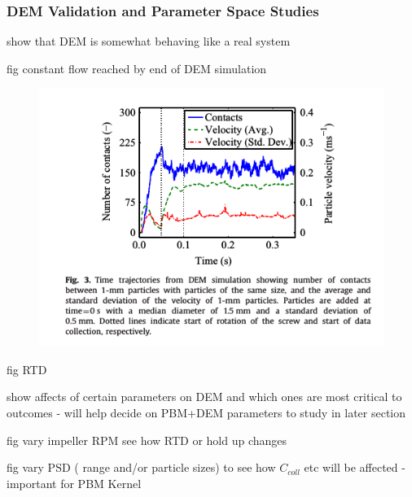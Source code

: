 \documentclass[preprint,11pt,authoryear]{elsarticle}
\begin{document}
    \subsubsection{DEM Validation and Parameter Space Studies}
    \par show that DEM is somewhat behaving like a real system
    \par fig constant flow reached by end of DEM simulation
      \begin{figure}[H]
      \centering
      \includegraphics[scale=0.8]{rslts_DEM_time_traj}
      \caption{  }
      \label{fig:rslts_DEM_time_traj}
      \end{figure} 
    \par fig RTD
    \par show affects of certain parameters on DEM and which ones are most critical to outcomes - will help decide on PBM+DEM parameters to study in later section
    \par fig vary impeller RPM see how RTD or hold up changes
    \par fig vary PSD ( range and/or particle sizes) to see how $C_{coll}$ etc will be affected - important for PBM Kernel
\end{document}
